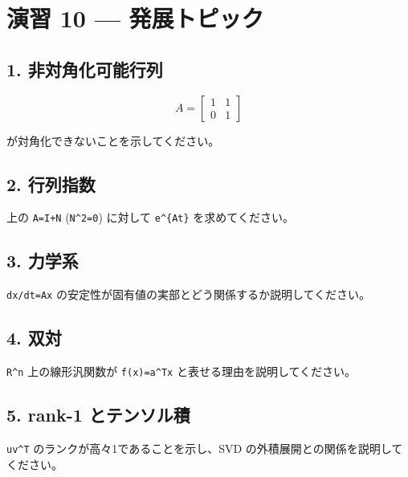 \documentclass[
  11pt,
  a4paper,
]{ltjsarticle}
\author{}
\date{}
\begin{document}
\hypertarget{ux6f14ux7fd2-10-ux767aux5c55ux30c8ux30d4ux30c3ux30af}{%
\section{演習 10 ---
発展トピック}\label{ux6f14ux7fd2-10-ux767aux5c55ux30c8ux30d4ux30c3ux30af}}

\hypertarget{ux975eux5bfeux89d2ux5316ux53efux80fdux884cux5217}{%
\subsection{1.
非対角化可能行列}\label{ux975eux5bfeux89d2ux5316ux53efux80fdux884cux5217}}

\[
A=\begin{bmatrix}1&1\\0&1\end{bmatrix}
\]

が対角化できないことを示してください。

\hypertarget{ux884cux5217ux6307ux6570}{%
\subsection{2. 行列指数}\label{ux884cux5217ux6307ux6570}}

上の \texttt{A=I+N} (\texttt{N\^{}2=0}) に対して \texttt{e\^{}\{At\}}
を求めてください。

\hypertarget{ux529bux5b66ux7cfb}{%
\subsection{3. 力学系}\label{ux529bux5b66ux7cfb}}

\texttt{dx/dt=Ax}
の安定性が固有値の実部とどう関係するか説明してください。

\hypertarget{ux53ccux5bfe}{%
\subsection{4. 双対}\label{ux53ccux5bfe}}

\texttt{R\^{}n} 上の線形汎関数が \texttt{f(x)=a\^{}Tx}
と表せる理由を説明してください。

\hypertarget{rank-1-ux3068ux30c6ux30f3ux30bdux30ebux7a4d}{%
\subsection{5. rank-1
とテンソル積}\label{rank-1-ux3068ux30c6ux30f3ux30bdux30ebux7a4d}}

\texttt{uv\^{}T} のランクが高々1であることを示し、SVD
の外積展開との関係を説明してください。
\end{document}
